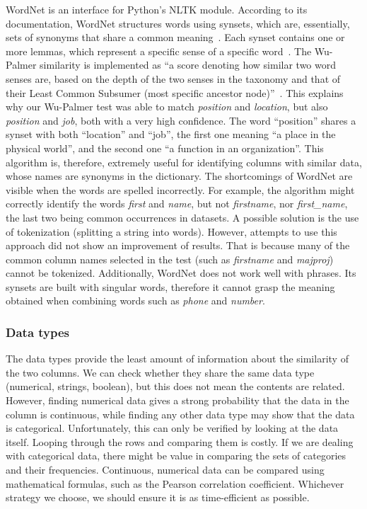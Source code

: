 WordNet is an interface for Python's NLTK module.
According to its documentation, WordNet structures words using synsets, which are, essentially, sets of synonyms that
share a common meaning~\cite{wordnet}.
Each synset contains one or more lemmas, which represent a specific sense of a specific word~\cite{wordnet}.
The Wu-Palmer similarity is implemented as ``a score denoting how similar two word senses are, based on the depth of the
two senses in the taxonomy and that of their Least Common Subsumer (most specific ancestor node)''~\cite{wordnet}.
This explains why our Wu-Palmer test was able to match \textit{position} and \textit{location}, but also \textit{position}
and \textit{job}, both with a very high confidence.
The word ``position'' shares a synset with both ``location'' and ``job'', the first one meaning ``a place in the physical world'',
and the second one ``a function in an organization''.
This algorithm is, therefore, extremely useful for identifying columns with similar data, whose names are synonyms in the
dictionary.
The shortcomings of WordNet are visible when the words are spelled incorrectly.
For example, the algorithm might correctly identify the words \textit{first} and \textit{name}, but not \textit{firstname},
nor \textit{first\_name}, the last two being common occurrences in datasets.
A possible solution is the use of tokenization (splitting a string into words).
However, attempts to use this approach did not show an improvement of results.
That is because many of the common column names selected in the test (such as \textit{firstname} and \textit{majproj}) cannot
be tokenized.
Additionally, WordNet does not work well with phrases.
Its synsets are built with singular words, therefore it cannot grasp the meaning obtained when combining words such as
\textit{phone} and \textit{number}.

\subsubsection{Data types}
The data types provide the least amount of information about the similarity of the two columns.
We can check whether they share the same data type (numerical, strings, boolean), but this does not mean the contents
are related.
However, finding numerical data gives a strong probability that the data in the column is continuous, while finding any other
data type may show that the data is categorical.
Unfortunately, this can only be verified by looking at the data itself.
Looping through the rows and comparing them is costly.
If we are dealing with categorical data, there might be value in comparing the sets of categories and their frequencies.
Continuous, numerical data can be compared using mathematical formulas, such as the Pearson correlation coefficient.
Whichever strategy we choose, we should ensure it is as time-efficient as possible.

